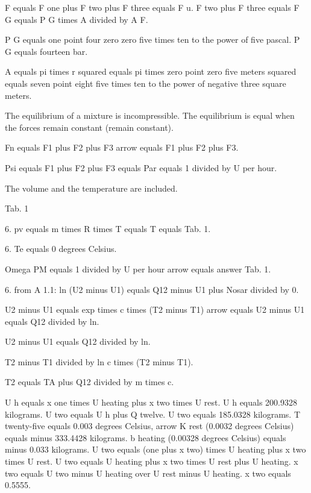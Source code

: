 F equals F one plus F two plus F three equals F u. F two plus F three equals F G equals P G times A divided by A F.

P G equals one point four zero zero five times ten to the power of five pascal. P G equals fourteen bar.

A equals pi times r squared equals pi times zero point zero five meters squared equals seven point eight five times ten to the power of negative three square meters.

The equilibrium of a mixture is incompressible. The equilibrium is equal when the forces remain constant (remain constant).

Fn equals F1 plus F2 plus F3 arrow equals F1 plus F2 plus F3.

Psi equals F1 plus F2 plus F3 equals Par equals 1 divided by U per hour.

The volume and the temperature are included.

Tab. 1

6. pv equals m times R times T equals T equals Tab. 1.

6. Te equals 0 degrees Celsius.

Omega PM equals 1 divided by U per hour arrow equals answer Tab. 1.

6. from A 1.1: ln (U2 minus U1) equals Q12 minus U1 plus Nosar divided by 0.

U2 minus U1 equals exp times c times (T2 minus T1) arrow equals U2 minus U1 equals Q12 divided by ln.

U2 minus U1 equals Q12 divided by ln.

T2 minus T1 divided by ln c times (T2 minus T1).

T2 equals TA plus Q12 divided by m times c.

U h equals x one times U heating plus x two times U rest.  
U h equals 200.9328 kilograms.  
U two equals U h plus Q twelve.  
U two equals 185.0328 kilograms.  
T twenty-five equals 0.003 degrees Celsius, arrow K rest (0.0032 degrees Celsius) equals minus 333.4428 kilograms.  
b heating (0.00328 degrees Celsius) equals minus 0.033 kilograms.  
U two equals (one plus x two) times U heating plus x two times U rest.  
U two equals U heating plus x two times U rest plus U heating.  
x two equals U two minus U heating over U rest minus U heating.  
x two equals 0.5555.